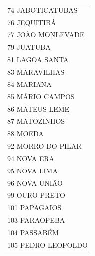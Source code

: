 \documentclass{article}
\begin{document}
\begin{longtable}[c]{m{18cm}}
\multicolumn{1}{l}{ \hspace{2em} 74 JABOTICATUBAS } \\
\multicolumn{1}{l}{ \hspace{2em} 76 JEQUITIBÁ } \\
\multicolumn{1}{l}{ \hspace{2em} 77 JOÃO MONLEVADE } \\
\multicolumn{1}{l}{ \hspace{2em} 79 JUATUBA } \\
\multicolumn{1}{l}{ \hspace{2em} 81 LAGOA SANTA } \\
\multicolumn{1}{l}{ \hspace{2em} 83 MARAVILHAS } \\
\multicolumn{1}{l}{ \hspace{2em} 84 MARIANA } \\
\multicolumn{1}{l}{ \hspace{2em} 85 MÁRIO CAMPOS } \\
\multicolumn{1}{l}{ \hspace{2em} 86 MATEUS LEME } \\
\multicolumn{1}{l}{ \hspace{2em} 87 MATOZINHOS } \\
\multicolumn{1}{l}{ \hspace{2em} 88 MOEDA } \\
\multicolumn{1}{l}{ \hspace{2em} 92 MORRO DO PILAR } \\
\multicolumn{1}{l}{ \hspace{2em} 94 NOVA ERA } \\
\multicolumn{1}{l}{ \hspace{2em} 95 NOVA LIMA } \\
\multicolumn{1}{l}{ \hspace{2em} 96 NOVA UNIÃO } \\
\multicolumn{1}{l}{ \hspace{2em} 99 OURO PRETO } \\
\multicolumn{1}{l}{ \hspace{2em} 101 PAPAGAIOS } \\
\multicolumn{1}{l}{ \hspace{2em} 103 PARAOPEBA } \\
\multicolumn{1}{l}{ \hspace{2em} 104 PASSABÉM } \\
\multicolumn{1}{l}{ \hspace{2em} 105 PEDRO LEOPOLDO } \\

\end{longtable}
\end{document}
